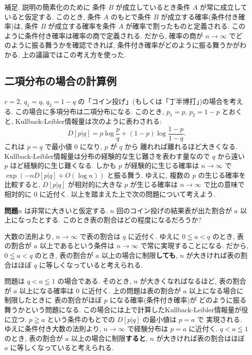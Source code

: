 \documentclass[12pt,twoside]{jarticle}
\theoremstyle{definition} %
\theoremstyle{definition} %
\theoremstyle{definition} %
\numberwithin{theorem}{section}
\numberwithin{equation}{section}
\numberwithin{figure}{section}
\numberwithin{table}{section}
\begin{document}
補足. 説明の簡素化のために
条件 $B$ が成立しているとき条件 $A$ が常に成立していると仮定する.
このとき, 条件 $A$ のもとで条件 $B$ が成立する確率(条件付き確率)は, 
条件 $B$ が成立する確率を条件 $A$ が確率で割ったものと定義される.
このように条件付き確率は確率の商で定義される.
だから, 確率の商が $n\to\infty$ でどのように振る舞うかを確認できれば,
条件付き確率がどのように振る舞うかがわかる. 
上の議論ではこの考え方を使った.


\subsection{二項分布の場合の計算例}
\label{sec:binom-Sanov}

$r=2$, $q_1=q$, $q_2=1-q$ の「コイン投げ」(もしくは「丁半博打」)の場合を考える.
この場合に多項分布は二項分布になる.
このとき, $p_1=p$, $p_2=1-p$ とおくと, 
Kullback-Leibler情報量は次のように表わされる:
\[
D[p|q]=p\log \frac{p}{q}+(1-p)\log\frac{1-p}{1-q}. 
\]
これは $p=q$ で最小値 $0$ になり, $p$ が $q$ から
離れれば離れるほど大きくなる.
Kullback-Leibler情報量は分布の経験的な生じ難さを表わす量なので
$q$ から遠い $p$ ほど経験的に生じ難くなる.
しかも $p$ が経験的に生じる確率は $n\to\infty$ で
$\exp(-nD[p|q]+O(\log n))$ と振る舞う.
ゆえに, 複数の $p$ の生じる確率を比較すると, 
$D[p|q]$ が相対的に大きな $p$ が生じる確率は
$n\to\infty$ で比の意味で相対的に $0$ に近付く. 
以上を踏まえた上で次の問題について考えよう.

\medskip

{\bf 問題}\enspace $n$ は非常に大きいと仮定する.
$n$ 回のコイン投げの結果表が出た割合が $a$ 以上になったとする.
このとき表の割合はどの程度になるだろうか?

\medskip

大数の法則より, $n\to\infty$ で表の割合は $q$ に近付く.
ゆえに $0\leqq a<q$ のとき, 表の割合が $a$ 以上であるという条件は
$n\to\infty$ で常に実現することになる.
だから, $0\leqq a<q$ のとき, 表の割合が $a$ 以上の場合に制限{\bf しても}, 
$n$ が大きければ表の割合はほぼ $q$ に等しくなっていると考えられる.

問題は $q<a\leqq 1$ の場合である. 
そのとき, $n$ が大きくなればなるほど, 
表の割合が $a$ 以上になる確率は $0$ に近付く.  
上の問題は表の割合が $a$ 以上になる場合に制限したときに
表の割合がほぼ $p$ になる確率(条件付き確率)が
どのように振る舞うかという問題になる.
この場合には上で計算したKullback-Leibler情報量が役に立つ.
$p\geqq a$ という条件のもとでの $D[p|q]$ の最小値は $p=a$ で
実現される. ゆえに条件付き大数の法則より, 
$n\to\infty$ で経験分布は $p=a$ に近付く.
$q<a\leqq 1$ のとき, 表の割合が $a$ 以上の場合に制限{\bf すると}, 
$n$ が大きければ表の割合はほぼ $a$ に等しくなっていると考えられる.
\end{document}
